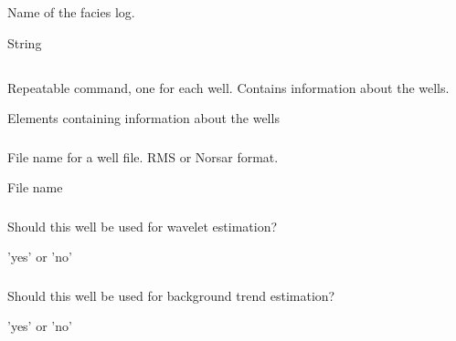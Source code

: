 \subsubsection{}
 \slist
   \item \Description Name of the facies log.
   \item \Argument String
   \item \Default %
 \elist

\subsection{}
 \slist
   \item \Description Repeatable command, one for each well. Contains information about the wells.
   \item \Argument Elements containing information about the wells
   \item \Default
 \elist

\subsubsection{}
 \slist
   \item \Description File name for a well file. RMS or Norsar format.
   \item \Argument File name
   \item \Default
 \elist


\subsubsection{}
 \slist
   \item \Description Should this well be used for wavelet estimation?
   \item \Argument 'yes' or 'no'
   \item \Default
 \elist

\subsubsection{}
 \slist
   \item \Description Should this well be used for background trend estimation?
   \item \Argument 'yes' or 'no'
   \item \Default
 \elist

